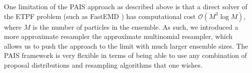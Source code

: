 \documentclass[final]{siamltex}
\begin{document}
One limitation of the PAIS approach as described above is that a
direct solver of the ETPF problem (such as FastEMD \cite{FastEMD}) has computational cost
$\mathcal{O}(M^3\log M)$, where $M$ is the number of particles in the
ensemble. As such, we introduced a more approximate resampler the
approximate multinomial resampler, which allows us to push the
approach to the limit
with much larger ensemble sizes. The PAIS framework is very flexible
in terms of being able to use any combination of proposal
distributions and resampling algorithms that one wishes.






\end{document}
